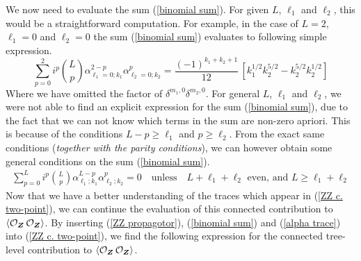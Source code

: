 We now need to evaluate the sum (\ref{binomial sum}). For given $L$, $\ell_1$ and $\ell_2$, this would be a straightforward computation. For example, in the case of $L=2$, $\ell_1 = 0$ and $\ell_2 = 0$ the sum (\ref{binomial sum}) evaluates to following simple expression. 
%
%
\begin{equation}
\sum_{p=0}^{2}
i^p
\binom{L}{p}
\alpha_{\ell_1=0;k_1}^{2-p} \alpha_{\ell_2=0;k_2}^{p}
=
\frac{(-1)^{k_1 + k_2 + 1}}{12} \, \left[
k_1^{1/2} k_2^{5/2}
-
k_2^{5/2} k_2^{1/2}
\right]
\end{equation}
%
%
Where we have omitted the factor of $\delta^{m_1,0} \delta^{m_2,0}$. For general $L$, $\ell_1$ and $\ell_2$, we were not able to find an explicit expression for the sum (\ref{binomial sum}), due to the fact that we can not know which terms in the sum are non-zero apriori. This is because of the conditions $L-p \geq \ell_1$ and $p \geq \ell_2$. From the exact same conditions (\textit{together with the parity conditions}), we can however obtain some general conditions on the sum (\ref{binomial sum}).
%
%
\begin{align}\label{binomial sum conditions}
\sum_{p=0}^{L}
i^p
\binom{L}{p}
\alpha_{\ell_1;k_1}^{L-p} \alpha_{\ell_2;k_2}^{p}
=
0
%
\quad \text{unless} \quad
%
L + \ell_1 + \ell_2
\text{ even, and }
L \geq \ell_1 + \ell_2
\end{align}
%
%
Now that we have a better understanding of the traces which appear in (\ref{ZZ c. two-point}), we can continue the evaluation of this connected contribution to $\expval{\mathcal{O}_{\boldsymbol{Z}} \, \mathcal{O}_{\boldsymbol{Z}}}$. By inserting (\ref{ZZ propagotor}), (\ref{binomial sum}) and (\ref{alpha trace}) into (\ref{ZZ c. two-point}), we find the following expression for the connected tree-level contribution to $\expval{\mathcal{O}_{\boldsymbol{Z}} \, \mathcal{O}_{\boldsymbol{Z}}}$.
